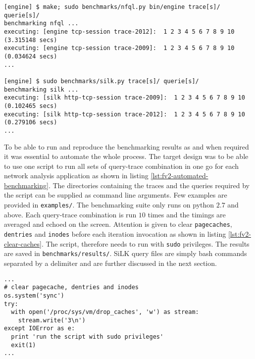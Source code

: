 \begin{lstlisting}
[engine] $ make; sudo benchmarks/nfql.py bin/engine trace[s]/ querie[s]/
benchmarking nfql ...
executing: [engine tcp-session trace-2012]:  1 2 3 4 5 6 7 8 9 10 (3.315148 secs)
executing: [engine tcp-session trace-2009]:  1 2 3 4 5 6 7 8 9 10 (0.034624 secs)
...

[engine] $ sudo benchmarks/silk.py trace[s]/ querie[s]/
benchmarking silk ...
executing: [silk http-tcp-session trace-2009]:  1 2 3 4 5 6 7 8 9 10 (0.102465 secs)
executing: [silk http-tcp-session trace-2012]:  1 2 3 4 5 6 7 8 9 10 (0.279106 secs)
...
\end{lstlisting}

To be able to run and reproduce the benchmarking results as and when required
it was essential to automate the whole process. The target design was to be
able to use one script to run all sets of query-trace combination in one go
for each network analysis application as shown in listing
\ref{lst:fv2-automated-benchmarking}. The directories containing the traces
and the queries required by the script can be supplied as command line
arguments. Few examples are provided in \texttt{examples/}. The benchmarking
suite only runs on python $2.7$ and above. Each query-trace combination is run
$10$ times and the timings are averaged and echoed on the screen. Attention is
given to clear \texttt{pagecaches}, \texttt{dentries} and \texttt{inodes}
before each iteration invocation as shown in listing
\ref{lst:fv2-clear-caches}. The script, therefore needs to run with
\texttt{sudo} privileges. The results are saved in
\texttt{benchmarks/results/}. SiLK query files are simply bash commands
separated by a delimiter and are further discussed in the next section.

\begin{lstlisting}
...
# clear pagecache, dentries and inodes
os.system('sync')
try:
  with open('/proc/sys/vm/drop_caches', 'w') as stream:
    stream.write('3\n')
except IOError as e:
  print 'run the script with sudo privileges'
  exit(1)
...
\end{lstlisting}
